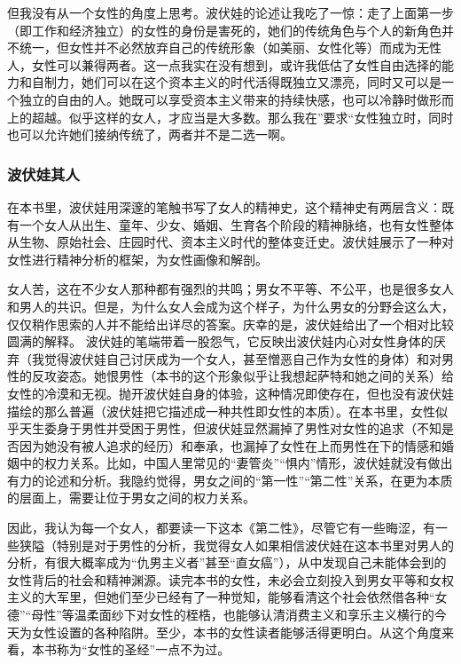 但我没有从一个女性的角度上思考。波伏娃的论述让我吃了一惊：走了上面第一步（即工作和经济独立）的女性的身份是害死的，她们的传统角色与个人的新角色并不统一，但女性并不必然放弃自己的传统形象（如美丽、女性化等）而成为无性人，女性可以兼得两者。这一点我实在没有想到，或许我低估了女性自由选择的能力和自制力，她们可以在这个资本主义的时代活得既独立又漂亮，同时又可以是一个独立的自由的人。她既可以享受资本主义带来的持续快感，也可以冷静时做形而上的超越。似乎这样的女人，才应当是大多数。那么我在”要求“女性独立时，同时也可以允许她们接纳传统了，两者并不是二选一啊。

\subsubsection{波伏娃其人}
在本书里，波伏娃用深邃的笔触书写了女人的精神史，这个精神史有两层含义：既有一个女人从出生、童年、少女、婚姻、生育各个阶段的精神脉络，也有女性整体从生物、原始社会、庄园时代、资本主义时代的整体变迁史。波伏娃展示了一种对女性进行精神分析的框架，为女性画像和解剖。

女人苦，这在不少女人那种都有强烈的共鸣；男女不平等、不公平，也是很多女人和男人的共识。但是，为什么女人会成为这个样子，为什么男女的分野会这么大，仅仅稍作思索的人并不能给出详尽的答案。庆幸的是，波伏娃给出了一个相对比较圆满的解释。
波伏娃的笔端带着一股怨气，它反映出波伏娃内心对女性身体的厌弃（我觉得波伏娃自己讨厌成为一个女人，甚至憎恶自己作为女性的身体）和对男性的反攻姿态。她恨男性（本书的这个形象似乎让我想起萨特和她之间的关系）给女性的冷漠和无视。抛开波伏娃自身的体验，这种情况即使存在，但也没有波伏娃描绘的那么普遍（波伏娃把它描述成一种共性即女性的本质）。在本书里，女性似乎天生委身于男性并受困于男性，但波伏娃显然漏掉了男性对女性的追求（不知是否因为她没有被人追求的经历）和奉承，也漏掉了女性在上而男性在下的情感和婚姻中的权力关系。比如，中国人里常见的“妻管炎”“惧内”情形，波伏娃就没有做出有力的论述和分析。我隐约觉得，男女之间的“第一性”“第二性”关系，在更为本质的层面上，需要让位于男女之间的权力关系。

因此，我认为每一个女人，都要读一下这本《第二性》，尽管它有一些晦涩，有一些狭隘（特别是对于男性的分析，我觉得女人如果相信波伏娃在这本书里对男人的分析，有很大概率成为“仇男主义者”甚至“直女癌”），从中发现自己未能体会到的女性背后的社会和精神渊源。读完本书的女性，未必会立刻投入到男女平等和女权主义的大军里，但她们至少已经有了一种觉知，能够看清这个社会依然借各种“女德”“母性”等温柔面纱下对女性的桎梏，也能够认清消费主义和享乐主义横行的今天为女性设置的各种陷阱。至少，本书的女性读者能够活得更明白。从这个角度来看，本书称为“女性的圣经”一点不为过。

